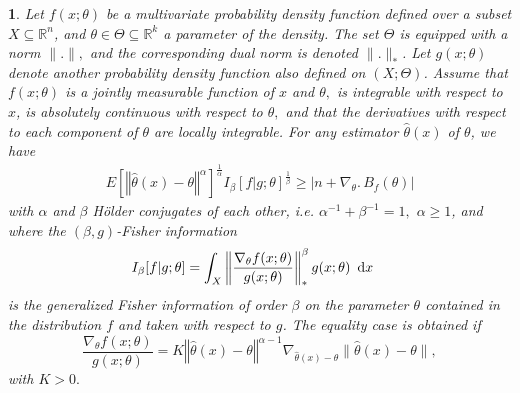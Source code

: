 \documentclass[english]{elsarticle}
\theoremstyle{definition}
\theoremstyle{plain}
\theoremstyle{plain}
\newtheorem{thm}{\protect\theoremname}
\providecommand{\theoremname}{Theorem}
\begin{document}
\begin{thm}
\label{GenericCRTheorem} Let $f(x;\theta)$ be a multivariate probability
density function defined over a subset $X\mathbb{\subseteq R}^{n}$,
and $\theta\in\Theta\subseteq\mathbb{R}^{k}$ a parameter of the density.
The set $\Theta$ is equipped with a norm $\|.\|,$ and the corresponding
dual norm is denoted $\|.\|_{*}$. Let $g(x;\theta)$ denote another
probability density function also defined on $(X;\Theta)$. Assume
that $f(x;\theta)$ is a jointly measurable function of $x$ and $\theta,$
is integrable with respect to $x$, is absolutely continuous with
respect to $\theta,$ and that the derivatives with respect to each
component of $\theta$ are locally integrable. For any estimator $\hat{\theta}(x)$
of $\theta$, we have 
\begin{gather}
E\left[\left\Vert \hat{\theta}(x)-\theta\right\Vert ^{\alpha}\right]^{\frac{1}{\alpha}}I_{\beta}[f|g;\theta]^{\frac{1}{\beta}}\geq\left|n+\nabla_{\theta}.\, B_{f}(\theta)\right|\label{eq:GeneralizedCramerRao-4}
\end{gather}
with $\alpha$ and $\beta$ Hölder conjugates of each other, i.e.
$\alpha^{-1}+\beta^{-1}=1,$ $\alpha\geq1$, and where the $(\beta,g)$-Fisher
information 
\begin{alignat}{1}
I_{\beta}[f|g;\theta] & =\int_{X}\left\Vert \frac{\nabla_{\theta}f(x;\theta)}{g(x;\theta)}\right\Vert _{*}^{\beta}g(x;\theta)\text{\,\ d}x\label{eq:GeneralizedFisher-4}
\end{alignat}
is the generalized Fisher information of order $\beta$ on the parameter
$\theta$ contained in the distribution $f$ and taken with respect
to $g$. The equality case is obtained if
\begin{equation}
\frac{\nabla_{\theta}f(x;\theta)}{g(x;\theta)}=K\left\Vert \hat{\theta}(x)-\theta\right\Vert ^{\alpha-1}\nabla_{\hat{\theta}(x)-\theta}\|\hat{\theta}(x)-\theta\|,\label{eq:CaseOfEqualityInCR-2}
\end{equation}
with $K>0.$\end{thm}
\end{document}
